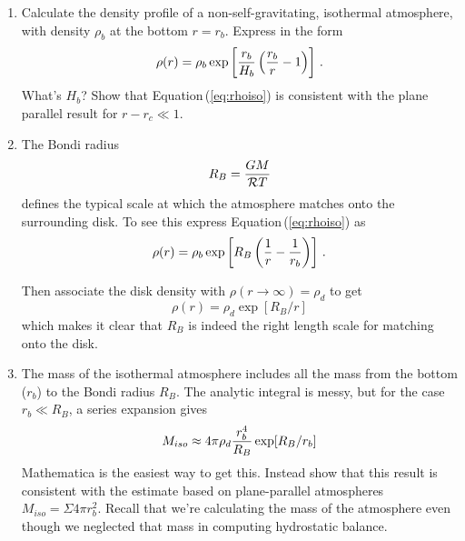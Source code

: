 \documentclass[11pt]{article}
\newcommand{\Rg}{\mathcal{R}}
\newcommand{\Eq}[1]{Equation\,(\ref{#1})}
\begin{document}
\begin{enumerate}
\begin{enumerate}
\item  Calculate the density profile of a non-self-gravitating, isothermal atmosphere, with density $\rho_b$ at the bottom $r = r_b$.  Express in the form
\begin{equation}\label{eq:rhoiso}
\rho(r) = \rho_b \exp\left[{r_b \over H_b}\left({r_b \over r} - 1 \right)\right]\, .
\end{equation} 
What's $H_b$?  Show that \Eq{eq:rhoiso} is consistent with the plane parallel result for $r - r_c \ll 1$.

\item The Bondi radius
\begin{equation}
R_B = {G M \over \Rg T}
\end{equation} 
defines the typical scale at which the atmosphere matches onto the surrounding disk.  To see this express \Eq{eq:rhoiso} as
\begin{equation}\label{eq:rhoisoB}
\rho(r) = \rho_b \exp \left[ R_B \left( {1 \over r} - {1 \over r_b} \right) \right]\, .
\end{equation} 

Then associate the disk density with $\rho(r \rightarrow \infty) = \rho_d$ to get
\begin{equation}\label{eq:rhoisod}
\rho(r) = \rho_d \exp[R_B/r]
\end{equation} 
which makes it clear that $R_B$ is indeed the right length scale for matching onto the disk.

\item The mass of the isothermal atmosphere includes all the mass from the bottom ($r_b$) to the Bondi radius $R_B$.   The analytic integral is messy, but for the case $r_b \ll R_B$, a series expansion gives
\begin{equation}
M_{iso} \approx 4 \pi \rho_d {r_b^4 \over R_B} \exp[R_B/r_b]
\end{equation} 
Mathematica is the easiest way to get this.  Instead show that this result is consistent with the estimate based on plane-parallel atmospheres $M_{iso} = \varSigma 4 \pi r_b^2$.  Recall that we're calculating the mass of the atmosphere even though we neglected that mass in computing hydrostatic balance.


\end{enumerate}
\end{enumerate}
\end{document}
